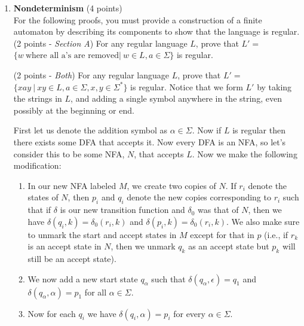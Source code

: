 \documentclass[11pt]{article}
\begin{document}
\begin{enumerate}
    \item \textbf{Nondeterminism} (4 points) \\
    For the following proofs, you must provide a construction of a finite automaton by describing its components to show that the language is regular. \\
    
    (2 points - \textit{Section A}) For any regular language $L$, prove that $L' = $ $\{w\ \text{where all a's are removed} |\ w \in L, a \in \Sigma\}$ is regular.
    
    \begin{answer}
    \end{answer}
    
    (2 points - \textit{Both}) 
    For any regular language $L$, prove that $L' = $ $\{xay\ |\ xy \in L, a \in \Sigma, x, y \in \Sigma^*\}$ is regular. Notice that we form $L'$ by taking the strings in $L$, and adding a single symbol anywhere in the string, even possibly at the beginning or end. 
    
    \begin{answer}

        First let us denote the addition symbol as $\alpha \in \Sigma$. Now if $L$ is regular then there exists some DFA that accepts it. Now every DFA is an NFA, so let's consider this to be some NFA, $N$, that accepts $L$. Now we make the following modification:
        \begin{enumerate}
    \item In our new NFA labeled $M$, we create two copies of $N$. If $r_i$ denote the states of $N$, then $p_i$ and $q_i$ denote the new copies corresponding to $r_i$ such that if $\delta$ is our new transition function and $\delta_0$ was that of $N$, then we have $\delta(q_i, k) = \delta_0(r_i, k)$ and $\delta(p_i, k) = \delta_0(r_i, k)$. We also make sure to unmark the start and accept states in $M$ except for that in $p$ (i.e., if $r_k$ is an accept state in $N$, then we unmark $q_k$ as an accept state but $p_k$ will still be an accept state).
    
    \item We now add a new start state $q_{\alpha}$ such that $\delta(q_{\alpha}, \epsilon) = q_1$ and $\delta(q_{\alpha}, \alpha) = p_1$ for all $\alpha \in \Sigma$.


\item Now for each $q_i$ we have $\delta(q_i, \alpha) = p_i$ for every $\alpha \in \Sigma$.


\end{enumerate}
\end{answer}
\end{enumerate}
\end{document}
